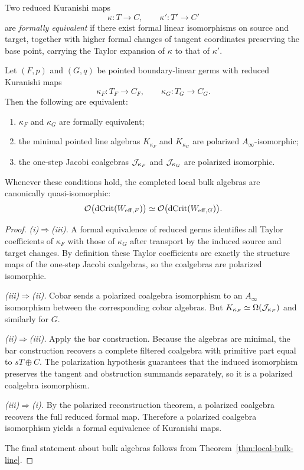 \begin{definition}
Two reduced Kuranishi maps
\[
\kappa:T\to C,
\qquad
\kappa':T'\to C'
\]
are \emph{formally equivalent} if there exist formal linear isomorphisms on source and target, together with higher formal changes of tangent coordinates preserving the base point, carrying the Taylor expansion of $\kappa$ to that of $\kappa'$.
\end{definition}

\begin{theorem}%
Let $(F,p)$ and $(G,q)$ be pointed boundary-linear germs with reduced Kuranishi maps
\[
\kappa_F:T_F\to C_F,
\qquad
\kappa_G:T_G\to C_G.
\]
Then the following are equivalent:
\begin{enumerate}[label=(\roman*),leftmargin=1.8em]
\item $\kappa_F$ and $\kappa_G$ are formally equivalent;
\item the minimal pointed line algebras $K_{\kappa_F}$ and $K_{\kappa_G}$ are polarized $A_\infty$-isomorphic;
\item the one-step Jacobi coalgebras $\mathcal J_{\kappa_F}$ and $\mathcal J_{\kappa_G}$ are polarized isomorphic.
\end{enumerate}
Whenever these conditions hold, the completed local bulk algebras are canonically quasi-isomorphic:
\[
\mathcal O\bigl(\operatorname{dCrit}(W_{\mathrm{eff},F})\bigr)\simeq \mathcal O\bigl(\operatorname{dCrit}(W_{\mathrm{eff},G})\bigr).
\]
\end{theorem}

\begin{proof}
\emph{(i)$\Rightarrow$(iii).}
A formal equivalence of reduced germs identifies all Taylor coefficients of $\kappa_F$ with those of $\kappa_G$ after transport by the induced source and target changes. By definition these Taylor coefficients are exactly the structure maps of the one-step Jacobi coalgebras, so the coalgebras are polarized isomorphic.

\emph{(iii)$\Rightarrow$(ii).}
Cobar sends a polarized coalgebra isomorphism to an $A_\infty$ isomorphism between the corresponding cobar algebras. But $K_{\kappa_F}\simeq \operatorname{\Omega}(\mathcal J_{\kappa_F})$ and similarly for $G$.

\emph{(ii)$\Rightarrow$(iii).}
Apply the bar construction. Because the algebras are minimal, the bar construction recovers a complete filtered coalgebra with primitive part equal to $sT\oplus C$. The polarization hypothesis guarantees that the induced isomorphism preserves the tangent and obstruction summands separately, so it is a polarized coalgebra isomorphism.

\emph{(iii)$\Rightarrow$(i).}
By the polarized reconstruction theorem, a polarized coalgebra recovers the full reduced formal map. Therefore a polarized coalgebra isomorphism yields a formal equivalence of Kuranishi maps.

The final statement about bulk algebras follows from Theorem~\ref{thm:local-bulk-line}.
\end{proof}

